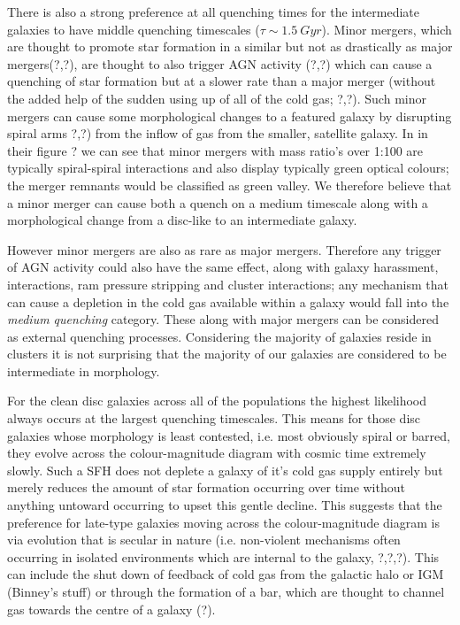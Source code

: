 \documentclass{mn2e}
\begin{document}
There is also a strong preference at all quenching times for the intermediate galaxies to have middle quenching timescales ($\tau \sim 1.5~Gyr$). Minor mergers, which are thought to promote star formation in a similar but not as drastically as major mergers(?,?), are thought to also trigger AGN activity (?,?) which can cause a quenching of star formation but at a slower rate than a major merger (without the added help of the sudden using up of all of the cold gas; ?,?). Such minor mergers can cause some morphological changes to a featured galaxy by disrupting spiral arms ?,?) from the inflow of gas from the smaller, satellite galaxy. In \citet{Darg} in their figure ? we can see that minor mergers with mass ratio's over 1:100 are typically spiral-spiral interactions and also display typically green optical colours; the merger remnants would be classified as green valley. We therefore believe that a minor merger can cause both a quench on a medium timescale along with a morphological change from a disc-like to an intermediate galaxy.

However minor mergers are also as rare as major mergers. Therefore any trigger of AGN activity could also have the same effect, along with galaxy harassment, interactions, ram pressure stripping and cluster interactions; any mechanism that can cause a depletion in the cold gas available within a galaxy would fall into the \emph{medium quenching} category. These along with major mergers can be considered as external quenching processes. Considering the majority of galaxies reside in clusters it is not surprising that the majority of our galaxies are considered to be intermediate in morphology. 

For the clean disc galaxies across all of the populations the highest likelihood always occurs at the largest quenching timescales. This means for those disc galaxies whose morphology is least contested, i.e. most obviously spiral or barred, they evolve across the colour-magnitude diagram with cosmic time extremely slowly. Such a SFH does not deplete a galaxy of it's cold gas supply entirely but merely reduces the amount of star formation occurring over time without anything untoward occurring to upset this gentle decline. This suggests that the preference for late-type galaxies moving across the colour-magnitude diagram is via evolution that is secular in nature (i.e. non-violent mechanisms often occurring in isolated environments which are internal to the galaxy, ?,?,?). This can include the shut down of feedback of cold gas from the galactic halo or IGM (Binney's stuff) or through the formation of a bar, which are thought to channel gas towards the centre of a galaxy (?).
\end{document}
